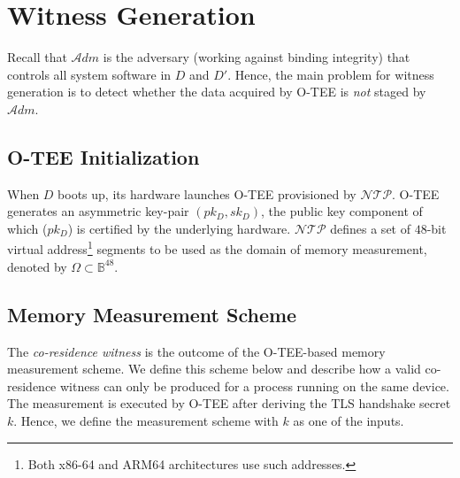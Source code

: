\documentclass[letterpaper,twocolumn,10pt]{article}
\newcommand{\N}{\ensuremath{\mathcal{N\!T}\mathcal{\!P}}\xspace}
\newcommand{\ADM}{\ensuremath{\mathcal{A}dm}\xspace}
\newcommand{\dn}{\ensuremath{D}\xspace}
\newcommand{\da}{\ensuremath{D'}\xspace}
\begin{document}
\section{Witness Generation}
\label{sec:wg}
%
Recall that \ADM is the adversary (working against binding integrity) that controls all system software
in \dn and \da. Hence, the main problem for witness generation is to detect
whether the data acquired by O-TEE is \emph{not} staged by \ADM.

\subsection{O-TEE Initialization}
When \dn boots up, its hardware launches O-TEE provisioned by \N.
O-TEE generates an asymmetric key-pair $(pk_D, sk_D)$, the public key component of which ($pk_D$) is certified by the
underlying hardware. \N defines a set of $48$-bit virtual address\footnote{Both x86-64 and ARM64 architectures
use such addresses.} segments to be used as the domain of memory measurement, denoted by
$\Omega\subset \mathbb{B}^{48}$.

\subsection{Memory Measurement Scheme}
\label{sec:mms}
The \emph{co-residence witness} is the outcome of the O-TEE-based memory measurement scheme. We define this
scheme below and describe how a valid co-residence witness can only be produced for a process running
on the same device. The measurement is executed by O-TEE after deriving the TLS
handshake secret $k$. Hence, we define the measurement scheme with $k$ as one of the inputs.
\end{document}
